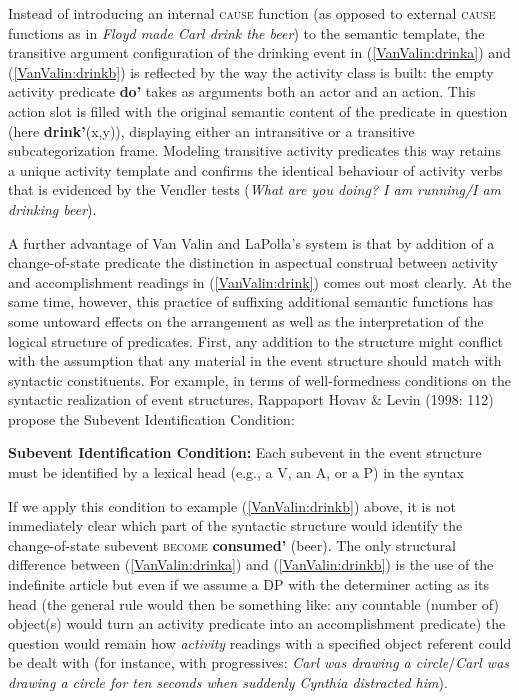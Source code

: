 Instead of introducing an internal \textsc{cause} function (as opposed to external \textsc{cause} functions as in \textit{Floyd made Carl drink the beer}) to the semantic template, the transitive argument configuration of the drinking event in (\ref{VanValin:drinka}) and (\ref{VanValin:drinkb}) is reflected by the way the activity class is built: the empty activity predicate \textbf{do'} takes as arguments both an actor and an action. This action slot is filled with the original semantic content of the predicate in question (here \textbf{drink'}(x,y)), displaying either an intransitive or a transitive subcategorization frame. Modeling transitive activity predicates this way retains a unique activity template and confirms the identical behaviour of activity verbs that is evidenced by the Vendler tests (\textit{What are you doing? I am running/I am drinking beer}). 

A further advantage of Van Valin and LaPolla's system is that by addition of a change-of-state predicate the distinction in aspectual construal between activity and accomplishment readings in (\ref{VanValin:drink}) comes out most clearly. At the same time, however, this practice of suffixing additional semantic functions has some untoward effects on the arrangement as well as the interpretation of the logical structure of predicates. First, any addition to the structure might conflict with the assumption that any material in the event structure should match with syntactic constituents. For example, in terms of well-formedness conditions on the syntactic realization of event structures, Rappaport Hovav \& Levin (1998: 112) propose the Subevent Identification Condition:
 
\ea \textbf{Subevent Identification Condition:} Each subevent in the event structure must be identified by a lexical head (e.g., a V, an A, or a P) in the syntax 
\z

If we apply this condition to example (\ref{VanValin:drinkb}) above, it is not immediately clear which part of the syntactic structure would identify the change-of-state subevent \textsc{become} \textbf{consumed'} (beer). The only structural difference between (\ref{VanValin:drinka}) and (\ref{VanValin:drinkb}) is the use of the indefinite article but even if we assume a DP with the determiner acting as its head (the general rule would then be something like: any countable (number of) object(s) would turn an activity predicate into an accomplishment predicate) the question would remain how \emph{activity} readings with a specified object referent could be dealt with (for instance, with progressives: \textit{Carl was drawing a circle}/\textit{Carl was drawing a circle for ten seconds when suddenly Cynthia distracted him}). 

